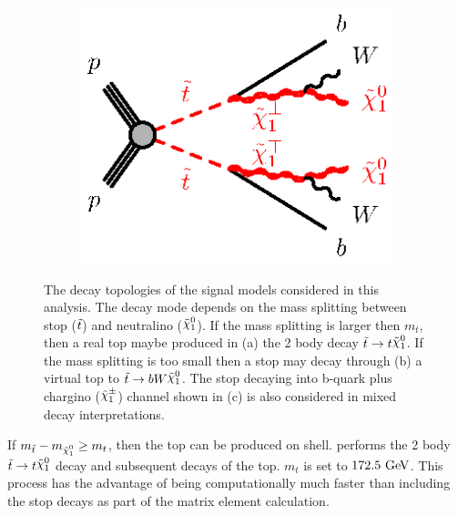 \begin{figure}[h!]
\begin{center}
\begin{subfigure}[b]{0.35\textwidth}
    \end{subfigure}
       \begin{subfigure}[b]{0.35\textwidth}  
      \includegraphics[width=\textwidth]{figures/feynDiag/stst-bbWWN1N1.eps}
               \caption{ }
    \end{subfigure}
\end{center}
\caption{The decay topologies of the signal models considered in this analysis.  The decay mode depends on the mass splitting between stop ($\tilde{t}$) and neutralino ($\ninoone$).   If the mass splitting is larger then $m_t$, then a real top maybe produced in (a) the 2 body decay $\stop\rightarrow t\ninoone$. If the mass splitting is too small then a stop may decay through (b) a virtual top to ${\stop}\rightarrow bW\ninoone$.  The stop decaying into b-quark plus chargino ($\chinoonepm$) channel shown in (c) is also considered in mixed decay interpretations. }
\label{fig:feynDiagModels} 
\end{figure}

\indent If $m_{\stop} - m_{\ninoone} \ge m_{t}$, then the top can be produced on shell. \pythiaeight\cite{Pythia8} performs the 2 body ${\stop} \rightarrow t \ninoone$ decay and subsequent decays of the top.  $m_{t}$ is set to $172.5 \gev$.  This process has the advantage of being computationally much faster than including the stop decays as part of the matrix element calculation.  \\ %

